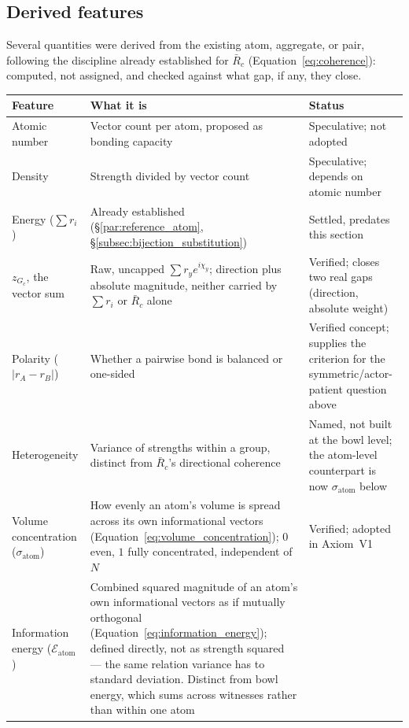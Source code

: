 \documentclass[12pt, a4paper]{article}
\begin{document}
\subsection{Derived features}
\label{subsec:assembly_features}
Several quantities were derived from the existing atom, aggregate,
or pair, following the discipline already established for $\bar
R_c$ (Equation~\eqref{eq:coherence}): computed, not assigned, and
checked against what gap, if any, they close.

\begin{center}
\begin{tabular}{lp{6.5cm}l}
\hline
Feature & What it is & Status \\
\hline
Atomic number &
  Vector count per atom, proposed as bonding capacity &
  Speculative; not adopted \\
Density &
  Strength divided by vector count &
  Speculative; depends on atomic number \\
Energy ($\sum r_i$) &
  Already established
  (\S\ref{par:reference_atom}, \S\ref{subsec:bijection_substitution}) &
  Settled, predates this section \\
$z_{G_c}$, the vector sum &
  Raw, uncapped $\sum r_y e^{i\chi_y}$; direction plus absolute
  magnitude, neither carried by $\sum r_i$ or $\bar R_c$ alone &
  Verified; closes two real gaps (direction, absolute weight) \\
Polarity ($\lvert r_A-r_B\rvert$) &
  Whether a pairwise bond is balanced or one-sided &
  Verified concept; supplies the criterion for the
  symmetric/actor-patient question above \\
Heterogeneity &
  Variance of strengths within a group, distinct from $\bar R_c$'s
  directional coherence &
  Named, not built at the bowl level; the atom-level counterpart is
  now $\sigma_{\text{atom}}$ below \\
Volume concentration ($\sigma_{\text{atom}}$) &
  How evenly an atom's volume is spread across its own
  informational vectors (Equation~\eqref{eq:volume_concentration});
  $0$ even, $1$ fully concentrated, independent of $N$ &
  Verified; adopted in Axiom~V1 \\
Information energy ($\mathcal{E}_{\text{atom}}$) &
  Combined squared magnitude of an atom's own informational vectors
  as if mutually orthogonal (Equation~\eqref{eq:information_energy});
  defined directly, not as strength squared --- the same relation
  variance has to standard deviation. Distinct from bowl energy,
  which sums across witnesses rather than within one atom &

\end{tabular}
\end{center}
\end{document}
